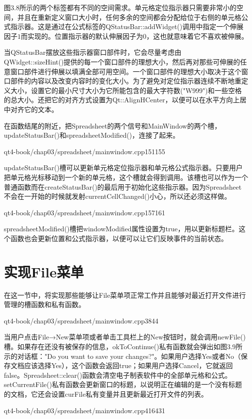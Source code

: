 \documentclass[11pt,oneside]{book}
\begin{document}
\begin{common-format}
图3.8所示的两个标签都有不同的空间需求。单元格定位指示器只需要非常小的空间，并且在重新定义窗口大小时，任何多余的空间都会分配给位于右侧的单元格公式指示器。这是通过在公式标签的QStatusBar::addWidget()调用中指定一个伸展因子$ 1 $而实现的。位置指示器的默认伸展因子为$ 0 $，这也就意味着它不喜欢被伸展。

当QStatusBar摆放这些指示器窗口部件时，它会尽量考虑由\\ QWidget::sizeHint()提供的每一个窗口部件的理想大小，然后再对那些可伸展的任意窗口部件进行伸展以填满全部可用空间。一个窗口部件的理想大小取决于这个窗口部件的内容以及改变内容时的变化大小。为了避免对定位指示器连续不断地重定义大小，设置它的最小尺寸大小为它所能包含的最大字符数("W999")和一些空格的总大小。还把它的对齐方式设置为Qt::AlignHCenter，以便可以在水平方向上居中对齐它的文本。

在函数结尾的附近，把Spreadsheet的两个信号和MainWindow的两个槽，updateStatusBar()和spreadsheetModified()，连接了起来。
\begin{cppline}{qt4-book/chap03/spreadsheet/mainwindow.cpp}{151}{155}
\end{cppline}

updateStatusBar()槽可以更新单元格定位指示器和单元格公式指示器。只要用户把单元格光标移动到一个新的单元格，这个槽就会得到调用。该槽也可以作为一个普通函数而在createStatusBar()的最后用于初始化这些指示器。因为Spreadsheet不会在一开始的时候就发射currentCellChanged()小心，所以还必须这样做。
\begin{cppline}{qt4-book/chap03/spreadsheet/mainwindow.cpp}{157}{161}
\end{cppline}

spreadsheetModified()槽把windowModified属性设置为true，用以更新标题栏。这个函数也会更新位置和公式指示器，以便可以让它们反映事件的当前状态。

\section{实现File菜单}
在这一节中，将实现那些能够让File菜单项正常工作并且能够对最近打开文件进行管理的槽函数和私有函数。
\begin{cppline}{qt4-book/chap03/spreadsheet/mainwindow.cpp}{38}{44}
\end{cppline}

当用户点击File→New菜单项或者单击工具栏上的New按钮时，就会调用newFile()槽。如果存在还没有被保存的信息，okToContinue()私有函数就会弹出如图3.9所示的对话框："Do you want to save your changes?"。如果用户选择Yes或者No（保存文档应该选择Yes），这个函数会返回true；如果用户选择Cancel，它就返回false。Spreadsheet::clear()函数会清空电子制表软件中的全部单元格和公式。setCurrentFile()私有函数会更新窗口的标题，以说明正在编辑的是一个没有标题的文档，它还会设置curFile私有变量并且更新最近打开文件的列表。  
\begin{cppline}{qt4-book/chap03/spreadsheet/mainwindow.cpp}{416}{431}
\end{cppline}


\end{common-format}
\end{document}
